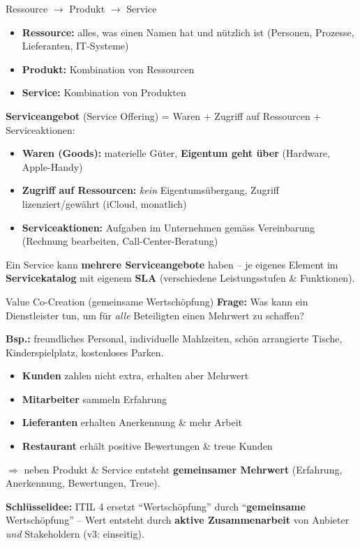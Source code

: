\documentclass[a4paper, fontsize=7pt]{scrartcl}
\begin{document}
\begin{mainbox}{Ressource $\to$ Produkt $\to$ Service}
\begin{itemize}
    \item \textbf{Ressource:} alles, was einen Namen hat und nützlich ist
          (Personen, Prozesse, Lieferanten, IT-Systeme)
    \item \textbf{Produkt:} Kombination von Ressourcen
    \item \textbf{Service:} Kombination von Produkten
\end{itemize}
\textbf{Serviceangebot} (Service Offering) = Waren + Zugriff auf Ressourcen
+ Serviceaktionen:
\begin{itemize}
    \item \textbf{Waren (Goods):} materielle Güter, \textbf{Eigentum geht
          über} (Hardware, Apple-Handy)
    \item \textbf{Zugriff auf Ressourcen:} \emph{kein} Eigentumsübergang,
          Zugriff lizenziert/gewährt (iCloud, monatlich)
    \item \textbf{Serviceaktionen:} Aufgaben im Unternehmen gemäss
          Vereinbarung (Rechnung bearbeiten, Call-Center-Beratung)
\end{itemize}
Ein Service kann \textbf{mehrere Serviceangebote} haben -- je eigenes
Element im \textbf{Servicekatalog} mit eigenem \textbf{SLA} (verschiedene
Leistungsstufen \& Funktionen).
\end{mainbox}

\begin{mainbox}{Value Co-Creation (gemeinsame Wertschöpfung)}
\textbf{Frage:} Was kann ein Dienstleister tun, um für \emph{alle}
Beteiligten einen Mehrwert zu schaffen?

\textbf{Bsp.:} freundliches Personal, individuelle Mahlzeiten, schön
arrangierte Tische, Kinderspielplatz, kostenloses Parken.
\begin{itemize}
    \item \textbf{Kunden} zahlen nicht extra, erhalten aber Mehrwert
    \item \textbf{Mitarbeiter} sammeln Erfahrung
    \item \textbf{Lieferanten} erhalten Anerkennung \& mehr Arbeit
    \item \textbf{Restaurant} erhält positive Bewertungen \& treue Kunden
\end{itemize}
$\Rightarrow$ neben Produkt \& Service entsteht \textbf{gemeinsamer
Mehrwert} (Erfahrung, Anerkennung, Bewertungen, Treue).

\textbf{Schlüsselidee:} ITIL 4 ersetzt ``Wertschöpfung'' durch
``\textbf{gemeinsame} Wertschöpfung'' -- Wert entsteht durch \textbf{aktive
Zusammenarbeit} von Anbieter \emph{und} Stakeholdern (v3: einseitig).
\end{mainbox}
\end{document}

